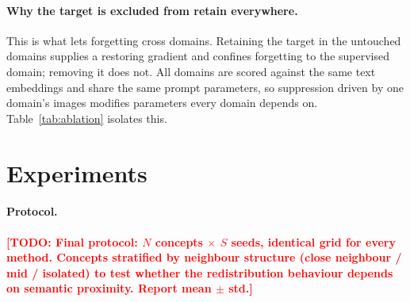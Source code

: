 \documentclass[10pt]{article}
\newcommand{\todo}[1]{\textcolor{red}{\textbf{[TODO: #1]}}}
\begin{document}
\paragraph{Why the target is excluded from retain everywhere.} This is what lets
forgetting cross domains. Retaining the target in the untouched domains supplies
a restoring gradient and confines forgetting to the supervised domain; removing
it does not. All domains are scored against the same text embeddings and share
the same prompt parameters, so suppression driven by one domain's images
modifies parameters every domain depends on. Table~\ref{tab:ablation} isolates
this.

\section{Experiments}
\label{sec:exp}

\paragraph{Protocol.} \todo{Final protocol: $N$ concepts $\times$ $S$ seeds,
identical grid for every method. Concepts stratified by neighbour structure
(close neighbour / mid / isolated) to test whether the redistribution behaviour
depends on semantic proximity. Report mean $\pm$ std.}
\end{document}
